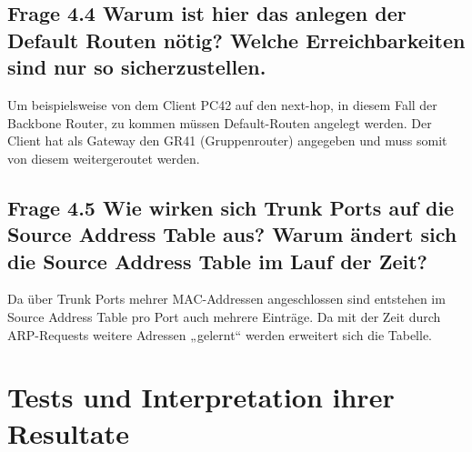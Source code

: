 \documentclass{article}
\begin{document}
\subsection*{Frage 4.4 \normalfont Warum ist hier das anlegen der Default Routen nötig? Welche Erreichbarkeiten sind nur so sicherzustellen.}
Um beispielsweise von dem Client PC42 auf den next-hop, in diesem Fall der Backbone Router, zu kommen müssen Default-Routen angelegt werden. Der Client hat als Gateway den GR41 (Gruppenrouter) angegeben und muss somit von diesem weitergeroutet werden.


\subsection*{Frage 4.5 \normalfont Wie wirken sich Trunk Ports auf die Source Address Table aus? Warum ändert sich die Source Address Table im Lauf der Zeit?}
Da über Trunk Ports mehrer MAC-Addressen angeschlossen sind entstehen im Source Address Table pro Port auch mehrere Einträge. Da mit der Zeit durch ARP-Requests weitere Adressen „gelernt“ werden erweitert sich die Tabelle.

\pagebreak
\section{Tests und Interpretation ihrer Resultate}
\end{document}
